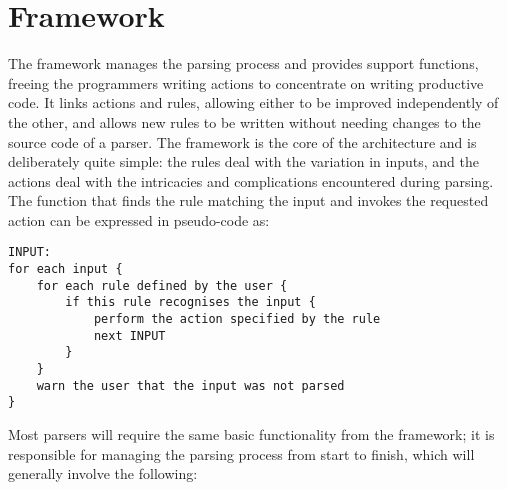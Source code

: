 \section{Framework}

\label{framework in architecture}

The framework manages the parsing process and provides support functions,
freeing the programmers writing actions to concentrate on writing
productive code.  It links actions and rules, allowing either to be
improved independently of the other, and allows new rules to be written
without needing changes to the source code of a parser.  The framework is
the core of the architecture and is deliberately quite simple: the rules
deal with the variation in inputs, and the actions deal with the
intricacies and complications encountered during parsing.  The function
that finds the rule matching the input and invokes the requested action can
be expressed in pseudo-code as:

\begin{verbatim}
INPUT:
for each input {
    for each rule defined by the user {
        if this rule recognises the input {
            perform the action specified by the rule
            next INPUT
        }
    }
    warn the user that the input was not parsed
}
\end{verbatim}

Most parsers will require the same basic functionality from the framework;
it is responsible for managing the parsing process from start to finish,
which will generally involve the following:

